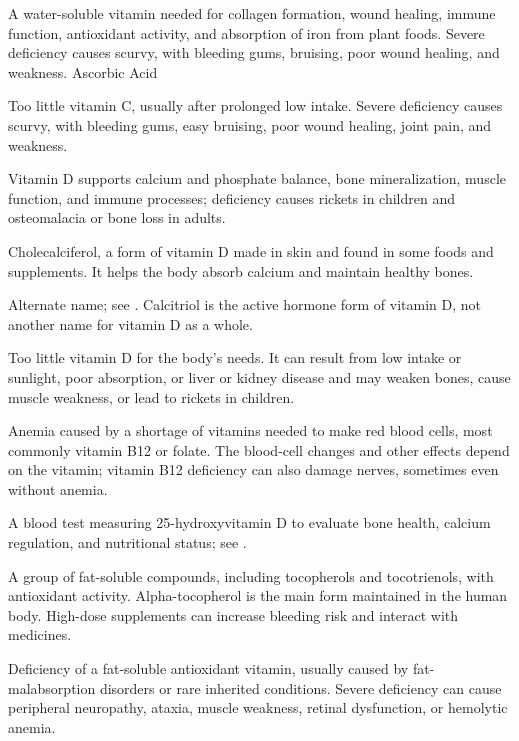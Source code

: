  A water-soluble vitamin needed for collagen formation, wound healing, immune function, antioxidant activity, and absorption of iron from plant foods. Severe deficiency causes scurvy, with bleeding gums, bruising, poor wound healing, and weakness.
\synonyms
Ascorbic Acid

 Too little vitamin C, usually after prolonged low intake. Severe deficiency causes scurvy, with bleeding gums, easy bruising, poor wound healing, joint pain, and weakness.

 Vitamin D supports calcium and phosphate balance, bone mineralization, muscle function, and immune processes; deficiency causes rickets in children and osteomalacia or bone loss in adults.

 Cholecalciferol, a form of vitamin D made in skin and found in some foods and supplements. It helps the body absorb calcium and maintain healthy bones.

 Alternate name; see . Calcitriol is the active hormone form of vitamin D, not another name for vitamin D as a whole.

 Too little vitamin D for the body’s needs. It can result from low intake or sunlight, poor absorption, or liver or kidney disease and may weaken bones, cause muscle weakness, or lead to rickets in children.

 Anemia caused by a shortage of vitamins needed to make red blood cells, most commonly vitamin B12 or folate. The blood-cell changes and other effects depend on the vitamin; vitamin B12 deficiency can also damage nerves, sometimes even without anemia.

 A blood test measuring 25-hydroxyvitamin D to evaluate bone health, calcium regulation, and nutritional status; see .

 A group of fat-soluble compounds, including tocopherols and tocotrienols, with antioxidant activity. Alpha-tocopherol is the main form maintained in the human body. High-dose supplements can increase bleeding risk and interact with medicines.

 Deficiency of a fat-soluble antioxidant vitamin, usually caused by fat-malabsorption disorders or rare inherited conditions. Severe deficiency can cause peripheral neuropathy, ataxia, muscle weakness, retinal dysfunction, or hemolytic anemia.

